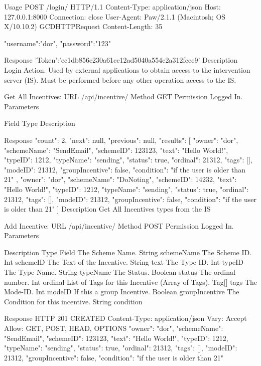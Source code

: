 Usage
POST /login/ HTTP/1.1
Content-Type: application/json
Host: 127.0.0.1:8000
Connection: close
User-Agent: Paw/2.1.1 (Macintosh; OS X/10.10.2) GCDHTTPRequest
Content-Length: 35
    {
        
            "username":"dor",
            "password":"123"
    }
Response
{
 'Token':'ec1db856e230a61cc12ad5040a554c2a312fcee9'
}
Description
Login Action. Used by external applications to obtain access to the intervention server (IS). Must be performed before any other operation access to the IS.






Get All Incentives:
URL
/api/incentive/
Method
GET
Permission
Logged In.
Parameters

Field
Type
Description








Response
{
    "count": 2,
    "next": null,
    "previous": null,
    "results": [
        {
            "owner": "dor",
            "schemeName": "SendEmail",
            "schemeID": 123123,
            "text": "Hello World!",
            "typeID": 1212,
            "typeName": "sending",
            "status": true,
            "ordinal": 21312,
            "tags": [],
            "modeID": 21312,
            "groupIncentive": false,
            "condition": "if the user is older than 21" 
        },
        {
            "owner": "dor",
            "schemeName": "DoNoting",
            "schemeID": 14232,
            "text": "Hello World!",
            "typeID": 1212,
            "typeName": "sending",
            "status": true,
            "ordinal": 21312,
            "tags": [],
            "modeID": 21312,
            "groupIncentive": false,
            "condition": "if the user is older than 21" 
        }
    ]
}
Description
Get All Incentives types from the IS

Add Incentive:
URL
/api/incentive/
Method
POST
Permission
Logged In.
Parameters

Description
Type
Field
The Scheme Name.
String
schemeName
The Scheme ID.
Int
schemeID
The Text of the Incentive.
String
text
The Type ID.
Int
typeID
The Type Name.
String
typeName
The Status.
Boolean
status
The ordinal number.
Int
ordinal
List of Tags for this Incentive (Array of Tags).
Tag[]
tags
The Mode-ID.
Int
modeID
If this a group Incentive.
Boolean
groupIncentive
The Condition for this incentive.
String
condition


Response
HTTP  201 CREATED
Content-Type: application/json 
Vary: Accept
Allow: GET, POST, HEAD, OPTIONS
        {
            "owner": "dor",
            "schemeName": "SendEmail",
            "schemeID": 123123,
            "text": "Hello World!",
            "typeID": 1212,
            "typeName": "sending",
            "status": true,
            "ordinal": 21312,
            "tags": [],
            "modeID": 21312,
            "groupIncentive": false,
            "condition": "if the user is older than 21" 
        }

